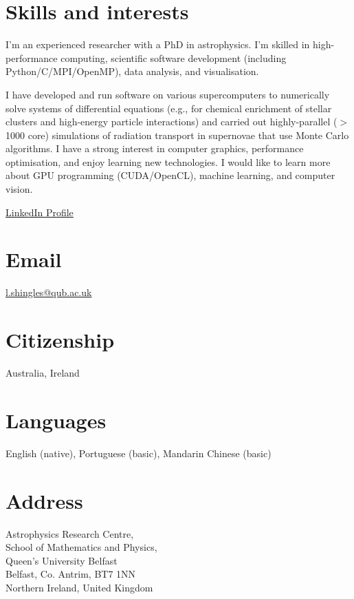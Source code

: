 \documentclass[11pt]{res} %
\begin{document}

\begin{resume}

\section{Skills and interests}
  I'm an experienced researcher with a PhD in astrophysics. I'm skilled in high-performance computing, scientific software development (including Python/C/MPI/OpenMP), data analysis, and visualisation.

  I have developed and run software on various supercomputers to numerically solve systems of differential equations (e.g., for chemical enrichment of stellar clusters and high-energy particle interactions) and carried out highly-parallel ($>$1000 core) simulations of radiation transport in supernovae that use Monte Carlo algorithms. I have a strong interest in computer graphics, performance optimisation, and enjoy learning new technologies. I would like to learn more about GPU programming (CUDA/OpenCL), machine learning, and computer vision.

  \href{https://www.linkedin.com/in/lukeshingles/}{LinkedIn Profile}

\section{Email}
  \href{mailto:l.shingles@qub.ac.uk}{l.shingles@qub.ac.uk}

\section{Citizenship}
  Australia, Ireland

\section{Languages}
  English (native), Portuguese (basic), Mandarin Chinese (basic)

\section{Address}
  Astrophysics Research Centre,\\
  School of Mathematics and Physics,\\
  Queen's University Belfast\\
  Belfast, Co. Antrim, BT7 1NN\\
  Northern Ireland, United Kingdom


\end{resume}
\end{document}
